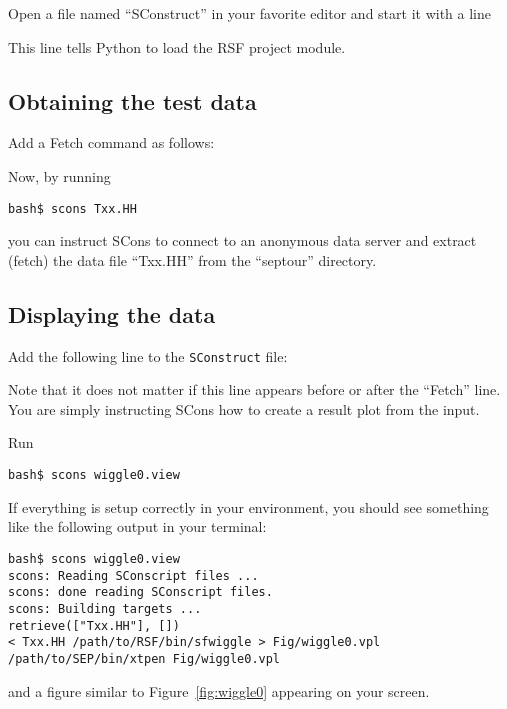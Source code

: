 Open a file named ``SConstruct'' in your favorite editor and start it with a
line 



This line tells Python to load the RSF project module.

\subsection{Obtaining the test data}

Add a Fetch command as follows:



Now, by running 
\begin{verbatim}
bash$ scons Txx.HH
\end{verbatim}
you can instruct SCons to connect to an anonymous data server and extract
(fetch) the data file ``Txx.HH'' from the ``septour'' directory.

\subsection{Displaying the data}


Add the following line to the \texttt{SConstruct} file:



Note that it does not matter if this line appears before or after the
``Fetch'' line. You are simply instructing SCons how to create a result plot
from the input. 

Run
\begin{verbatim}
bash$ scons wiggle0.view
\end{verbatim}
If everything is setup correctly in your environment, you should see 
something like the following output in your terminal:
\begin{verbatim}
bash$ scons wiggle0.view
scons: Reading SConscript files ...
scons: done reading SConscript files.
scons: Building targets ...
retrieve(["Txx.HH"], [])
< Txx.HH /path/to/RSF/bin/sfwiggle > Fig/wiggle0.vpl
/path/to/SEP/bin/xtpen Fig/wiggle0.vpl
\end{verbatim}
and a figure similar to Figure~\ref{fig:wiggle0} appearing on your screen.


